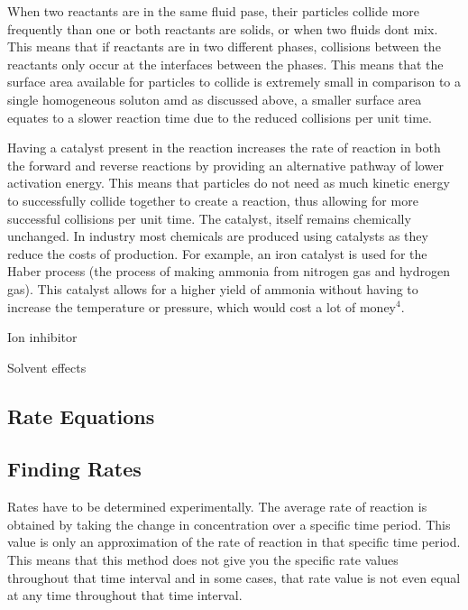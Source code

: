 When two reactants are in the same fluid pase, their particles collide more frequently than one or both reactants are solids, or when two fluids dont mix. This means that if reactants are in two different phases, collisions between the reactants only occur at the interfaces between the phases. This means that the surface area available for particles to collide is extremely small in comparison to a single homogeneous soluton amd as discussed above, a smaller surface area equates to a slower reaction time due to the reduced collisions per unit time.

Having a catalyst present in the reaction increases the rate of reaction in both the forward and reverse reactions by providing an alternative pathway of lower activation energy. This means that particles do not need as much kinetic energy to successfully collide together to create a reaction, thus allowing for more successful collisions per unit time. The catalyst, itself remains chemically unchanged. In industry most chemicals are produced using catalysts as they reduce the costs of production. For example, an iron catalyst is used for the Haber process (the process of making ammonia from nitrogen gas and hydrogen gas). This catalyst allows for a higher yield of ammonia without having to increase the temperature or pressure, which would cost a lot of money$^4$.

Ion inhibitor

Solvent effects

	\subsection{Rate Equations}





	\subsection{Finding Rates}


Rates have to be determined experimentally. The average rate of reaction is obtained by taking the change in concentration over a specific time period. This value is only an approximation of the rate of reaction in that specific time period. This means that this method does not give you the specific rate values throughout that time interval and in some cases, that rate value is not even equal at any time throughout that time interval.

